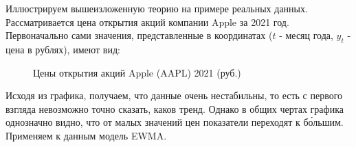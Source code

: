 Иллюстрируем вышеизложенную теорию на примере реальных данных. Рассматривается цена открытия акций компании Apple за 2021 год. Первоначально сами значения, представленные в координатах ($t$ - месяц года, $y_t$ - цена в рублях), имеют вид:
\begin{figure}[H]
	\centering
	\caption{Цены открытия акций Apple (AAPL) 2021 (руб.)}
\end{figure}
Исходя из графика, получаем, что данные очень нестабильны, то есть с первого взгляда невозможно точно сказать, каков тренд. Однако в общих чертах графика однозначно видно, что от малых значений цен показатели переходят к б\'{о}льшим. Применяем к данным модель EWMA.

